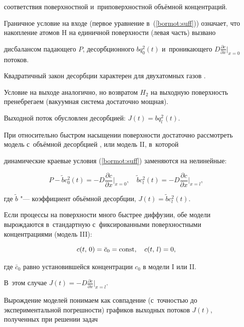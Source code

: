 соответствия поверхностной и~приповерхностной объёмной концентраций.

Граничное условие на входе (первое уравнение в~(\ref{bormot:suff})) означает, что накопление атомов H на единичной поверхности (левая часть) вызвано

дисбалансом падающего $P$, десорбционного $bq_0^2(t)$ и~проникающего $D\frac{\partial c}{\partial x}\big|_{x=0}$ потоков.

Квадратичный закон десорбции характерен для двухатомных газов \cite{bormatova:bib:Kunin}.

Условие на выходе аналогично, но возвратом $H_2$ на выходную поверхность пренебрегаем (вакуумная система достаточно мощная).

Выходной поток обусловлен десорбцией: $J(t)=bq_{l }^2(t)$.



При относительно быстром насыщении поверхности достаточно рассмотреть модель с~объёмной десорбцией \cite{bormatova:bib:Kunin}, или модель II, в~которой

динамические краевые условия (\ref{bormot:suff}) заменяются на нелинейные:

\begin{equation}

\label{bormot:vol}

P-\tilde bc_0^2(t)=-D\frac{\partial c}{\partial x}\Big|_{x=0}, \quad \tilde bc_l ^2(t)=-D\frac{\partial c}{\partial x}\Big|_{x=l },

\end{equation}

где $\tilde b$ "--- коэффициент объёмной десорбции, $J(t)=\tilde bc_l ^2(t)$.



Если процессы на поверхности много быстрее диффузии, обе модели вырождаются в~стандартную с~фиксированными поверхностными концентрациями (модель III):

\begin{equation}

\label{bormot:lin}

c(t,\,0)=\bar c_0={\rm const}, \quad c(t,\,l )=0,

\end{equation}

где $\bar c_0$ равно установившейся концентрации $c_0$ в модели I или II.

В~этом случае $J(t)=-D\frac{\partial c}{\partial x}\big|_{x=l }$.

Вырождение моделей понимаем как совпадение (с~точностью до экспериментальной погрешности) графиков выходных потоков $J(t)$, полученных при решении задач

